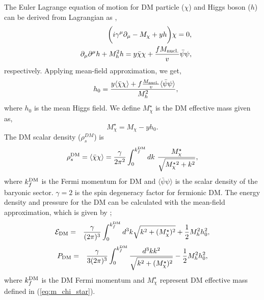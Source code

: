 {The Euler Lagrange equation of motion for DM particle ($\chi$) and Higgs boson ($h$) can be derived from Lagrangian as } \cite{DM3},
\begin{eqnarray}
	&&\bigg(i\gamma^{\mu}\partial_{\mu}-M_{\chi}+yh \bigg)\chi {}=0, \nonumber \\
	&&\partial_{\mu}\partial^{\mu}h+M_{h}^2h=y\bar{\chi}\chi+\frac{f M_{\rm nucl.}}{v}\bar{\psi}\psi,
	\label{eq:motion}
\end{eqnarray}
{respectively. Applying mean-field approximation, we get,}
\begin{eqnarray}
	&&h_0=\frac{y\langle\bar{\chi}\chi\rangle+ f\frac{M_{\rm nucl.}}{v}\langle\bar{\psi}\psi\rangle}{M_h^2},\nonumber 
\end{eqnarray}
{where $h_0$ is the mean Higgs field. We define $M_\chi^{\star}$ is the DM effective mass  given as, } 
\begin{equation}
	M_{\chi}^{\star} {}=M_{\chi}-yh_0. 
	\label{eq:m_chi_star}
\end{equation}
{The DM scalar density ($\rho_s^{DM}$)
	is}
\begin{equation}
	\rho_s^{\rm DM}=\langle\bar{\chi}\chi\rangle =  \frac{\gamma}{2 \pi^2}\int_0^{k_f^{\rm DM}} dk \  \frac{M_\chi^\star}{\sqrt{M_\chi^\star{^2}+ k^2}},
	\label{eq:dm_density}
\end{equation}
{where $k_f^{\rm DM}$ is the Fermi momentum for DM and $\langle\bar{\psi}\psi\rangle$ is the scalar density of the baryonic sector. $\gamma=2$ is the spin degeneracy factor for fermionic DM. The energy density and pressure for the DM can be calculated with the mean-field approximation, which is given by} \cite{DM1, DM3, DM2, mnras};
\begin{eqnarray}
	{\cal{E}}_{\rm DM}& = & \frac{\gamma}{(2\pi)^{3}}\int_0^{k_f^{\rm DM}} d^{3}k \sqrt{k^2 + (M_\chi^\star)^2} + \frac{1}{2}M_h^2 h_0^2 ,
	\label{eq:EDM}
\end{eqnarray}
\begin{eqnarray}
	P_{\rm DM}& = &\frac{\gamma}{3(2\pi)^{3}}\int_0^{k_f^{\rm DM}} \frac{d^{3}k k^2} {\sqrt{k^2 + (M_\chi^\star)^2}} - \frac{1}{2}M_h^2 h_0^2 ,
	\label{eq:PDM}
\end{eqnarray}
{where $k_f^{\rm DM}$  is the DM Fermi momentum and  $M_\chi^\star$ represent DM effective mass defined in (\ref{eq:m_chi_star}). }

